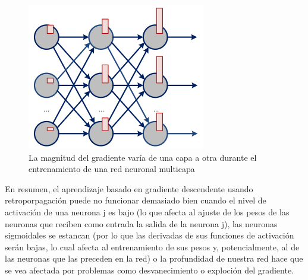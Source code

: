 \begin{figure}[H]
 \centering
 \includegraphics[scale=0.5]{../Figuras/vanish.png}
 \caption{La magnitud del gradiente varía de una capa a otra durante el entrenamiento de una red neuronal multicapa}
 \label{fig:vanish}
\end{figure}

En resumen, el aprendizaje basado en gradiente descendente usando retroporpagación puede no funcionar demasiado bien cuando el nivel de activación de una neurona j es bajo (lo que afecta al ajuste de los pesos de las neuronas que reciben como entrada la salida de la neurona j), las neuronas sigmoidales se estancan (por lo que las derivadas de sus funciones
de activación serán bajas, lo cual afecta al entrenamiento de sus pesos y, potencialmente, al de las neuronas que las preceden en la red) o la profundidad de nuestra red hace que se vea afectada por problemas como desvanecimiento o exploción del gradiente.

